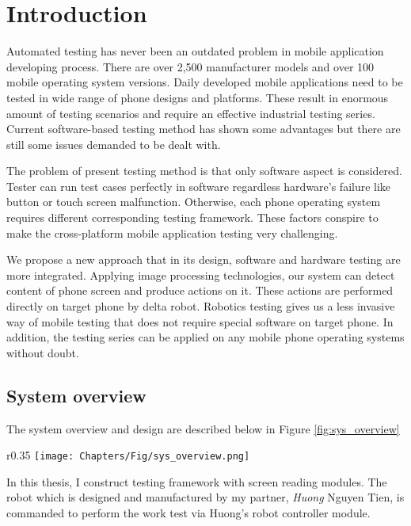 \chapter{Introduction}

Automated testing has never been an outdated problem in mobile application developing process. There are over 2,500 manufacturer models and over 100 mobile operating system versions\cite{crittercism}. Daily developed mobile applications need to be tested in wide range of phone designs and platforms. These result in enormous amount of testing scenarios and require an effective industrial testing series. Current software-based testing method has shown some advantages but there are still some issues demanded to be dealt with.

The problem of present testing method is that only software aspect is considered. Tester can run test cases perfectly in software regardless hardware's failure like button or touch screen malfunction. Otherwise, each phone operating system requires different corresponding testing framework. These factors conspire to make the cross-platform mobile application testing very challenging. \nocite{weinman_thesis}

We propose a new approach that in its design, software and hardware testing are more integrated. Applying image processing technologies, our system can detect content of phone screen and produce actions on it. These actions are performed directly on target phone by delta robot. Robotics testing gives us a less invasive way of mobile testing that does not require special software on target phone. In addition, the testing series can be applied on any mobile phone operating systems without doubt.

\section{System overview}
The system overview and design are described below in Figure \ref{fig:sys_overview}
	\begin{wrapfigure}{r}{0.35\linewidth}
		\vspace{-20pt} %
		\centering
		\texttt{[image: Chapters/Fig/sys\_overview.png]}
		\caption{System overview}
		\label{fig:sys_overview}
		\vspace{-25pt} %
	\end{wrapfigure}

In this thesis, I construct testing framework with screen reading modules. The robot which is designed and manufactured by my partner, \textit{Huong} Nguyen Tien, is commanded to perform the work test via Huong's robot controller module.

